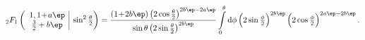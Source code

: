 \begin{equation}
{}_{2}F_1 \left(\begin{array}{c|} 1, 1 \!+\! a \ep \\
\frac{3}{2}+b \ep \end{array} ~\sin^2 \tfrac{\theta}{2} \right) =
\frac{(1\!+\! 2 b \ep)\left( 2 \cos \tfrac{\theta}{2} \right)^{2b\ep-2a\ep}}
{ \sin \theta \left( 2 \sin \tfrac{\theta}{2} \right)^{2b\ep}}
\int\limits_0^\theta {\rm d}\phi
\left(2 \sin \tfrac{\phi}{2} \right)^{2b\ep} 
\left(2 \cos \tfrac{\phi}{2} \right)^{2a\ep-2b\ep} . 
\label{basis_III}
\end{equation}

